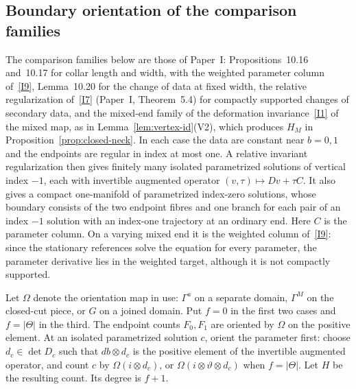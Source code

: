 \documentclass[11pt]{amsart}
\theoremstyle{definition}
\theoremstyle{remark}
\theoremstyle{plain}
\numberwithin{equation}{section}
\begin{document}
\subsection{Boundary orientation of the comparison families}
\label{subsec:torus-families}
The comparison families below are those of Paper~I:
Propositions~10.16 and~10.17 for collar length and width, with the
weighted parameter column of~\ref{I9}, Lemma~10.20 for the change of data
at fixed width, the relative regularization of~\ref{I7} (Paper~I,
Theorem~5.4) for compactly supported changes of secondary data, and the
mixed-end family of the deformation invariance~\ref{I1} of the mixed map, as in
Lemma~\ref{lem:vertex-id}(V2), which produces $H_M$ in
Proposition~\ref{prop:closed-neck}. In each case the data are constant
near $b=0,1$ and the endpoints are regular in index at most one. A
relative invariant regularization then gives finitely many isolated
parametrized solutions of vertical index $-1$, each with invertible
augmented operator $(v,\tau)\mapsto Dv+\tau C$. It also gives a compact
one-manifold of parametrized index-zero solutions, whose boundary
consists of the two endpoint fibres and one branch for each pair of an
index $-1$ solution with an index-one trajectory at an ordinary end.
Here $C$ is the parameter column. On a varying mixed end it is the
weighted column of~\ref{I9}: since the stationary references solve the
equation for every parameter, the parameter derivative lies in the
weighted target, although it is not compactly supported.

Let $\Omega$ denote the orientation map in use: $\Gamma^a$ on a
separate domain, $\Gamma^M$ on the closed-cut piece, or $G$ on a joined
domain. Put $f=0$ in the first two cases and $f=|\Theta|$ in the third. The
endpoint counts $F_0,F_1$ are oriented by $\Omega$ on the positive
element. At an isolated parametrized solution $c$, orient the parameter
first: choose $d_c\in\det D_c$ such that $db\otimes d_c$ is the positive
element of the invertible augmented operator, and count $c$ by
$\Omega(i\otimes d_c)$, or $\Omega(i\otimes \vartheta\otimes d_c)$ when $f=|\Theta|$. Let
$H$ be the resulting count. Its degree is $f+1$.
\end{document}
